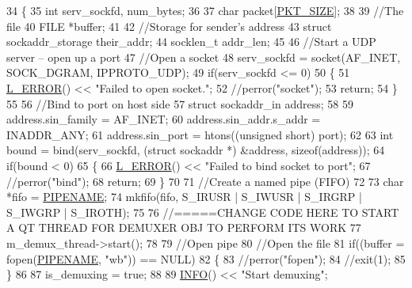 \begin{DoxyCode}
34 \{
35     \textcolor{keywordtype}{int} serv\_sockfd, num\_bytes;
36 
37     \textcolor{keywordtype}{char} packet[\hyperlink{ffmpegwrapper_8h_a0fa354abb723f3d7b1cdfea68545bb45}{PKT\_SIZE}];
38 
39     \textcolor{comment}{//The file}
40     FILE *buffer;
41 
42     \textcolor{comment}{//Storage for sender's address}
43     \textcolor{keyword}{struct }sockaddr\_storage their\_addr;
44     socklen\_t addr\_len;
45 
46     \textcolor{comment}{//Start a UDP server -- open up a port}
47     \textcolor{comment}{//Open a socket}
48     serv\_sockfd = socket(AF\_INET, SOCK\_DGRAM, IPPROTO\_UDP);
49     \textcolor{keywordflow}{if}(serv\_sockfd <= 0)
50     \{
51         \hyperlink{Log_8h_a1a242c34c5066fb0c62d909f22d3716d}{L\_ERROR}() << \textcolor{stringliteral}{"Failed to open socket."};
52         \textcolor{comment}{//perror("socket");}
53         \textcolor{keywordflow}{return};
54     \}
55 
56     \textcolor{comment}{//Bind to port on host side}
57     \textcolor{keyword}{struct }sockaddr\_in address;
58 
59     address.sin\_family = AF\_INET;
60     address.sin\_addr.s\_addr = INADDR\_ANY;
61     address.sin\_port = htons((\textcolor{keywordtype}{unsigned} \textcolor{keywordtype}{short}) port);
62 
63     \textcolor{keywordtype}{int} bound = bind(serv\_sockfd, (\textcolor{keyword}{struct} sockaddr *) &address, \textcolor{keyword}{sizeof}(address));
64     \textcolor{keywordflow}{if}(bound < 0)
65     \{
66         \hyperlink{Log_8h_a1a242c34c5066fb0c62d909f22d3716d}{L\_ERROR}() << \textcolor{stringliteral}{"Failed to bind socket to port"};
67         \textcolor{comment}{//perror("bind");}
68         \textcolor{keywordflow}{return};
69     \}
70 
71     \textcolor{comment}{//Create a named pipe (FIFO)}
72 
73     \textcolor{keywordtype}{char} *fifo = \hyperlink{ffmpegvideowidget_8h_aebde6daa4e9d1806e2c43f566475dfbe}{PIPENAME};
74     mkfifo(fifo, S\_IRUSR | S\_IWUSR | S\_IRGRP | S\_IWGRP | S\_IROTH);
75 
76     \textcolor{comment}{//=====CHANGE CODE HERE TO START A QT THREAD FOR DEMUXER OBJ TO PERFORM ITS WORK}
77     m\_demux\_thread->start();
78 
79     \textcolor{comment}{//Open pipe}
80     \textcolor{comment}{//Open the file}
81     \textcolor{keywordflow}{if}((buffer = fopen(\hyperlink{ffmpegvideowidget_8h_aebde6daa4e9d1806e2c43f566475dfbe}{PIPENAME}, \textcolor{stringliteral}{"wb"})) == NULL)
82     \{
83         \textcolor{comment}{//perror("fopen");}
84         \textcolor{comment}{//exit(1);}
85     \}
86 
87     is\_demuxing = \textcolor{keyword}{true};
88 
89     \hyperlink{Log_8h_a7cec51f4ce4b22e8c0f256485d57fca7}{INFO}() << \textcolor{stringliteral}{"Start demuxing"};

\end{DoxyCode}
